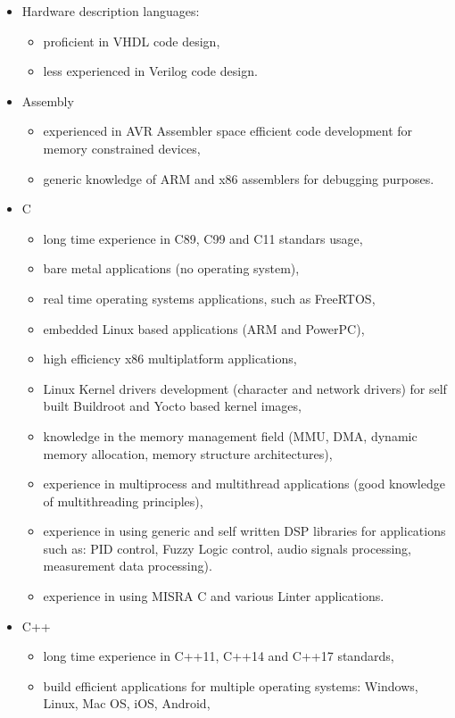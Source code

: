 \documentclass{tccv}
\begin{document}
\begin{itemize}
	\item Hardware description languages:
	\begin{itemize}
		\item proficient in VHDL code design,
		\item less experienced in Verilog code design. 
	\end{itemize}
	\item Assembly
		\begin{itemize}
			\item experienced in AVR Assembler space efficient code development for memory constrained devices,
			\item generic knowledge of ARM and x86 assemblers for debugging purposes.
		\end{itemize}
	\item C
		\begin{itemize}
			\item long time experience in C89, C99 and C11 standars usage,
			\item bare metal applications (no operating system),
			\item real time operating systems applications, such as FreeRTOS,
			\item embedded Linux based applications (ARM and PowerPC),
			\item high efficiency x86 multiplatform applications,
			\item Linux Kernel drivers development (character and network drivers) for self built Buildroot and Yocto based kernel images,
			\item knowledge in the memory management field (MMU, DMA, dynamic memory allocation, memory structure architectures),
			\item experience in multiprocess and multithread applications (good knowledge of multithreading principles),
			\item experience in using generic and self written DSP libraries for applications such as: PID control, Fuzzy Logic control, audio signals processing, measurement data processing).
			\item experience in using MISRA C and various Linter applications.
		\end{itemize}
	\item C++
		\begin{itemize}
			\item long time experience in C++11, C++14 and C++17 standards,
			\item build efficient applications for multiple operating systems: Windows, Linux, Mac OS, iOS, Android,

\end{itemize}
\end{itemize}
\end{document}
